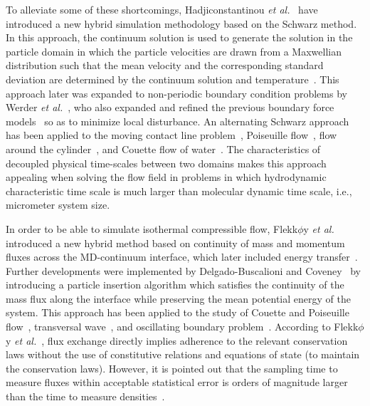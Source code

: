 \documentclass[preprint,12pt]{elsarticle}
\begin{document}
To alleviate some of these shortcomings, Hadjiconstantinou {\it{et al.}}~\cite{Hadjicon1,Hadjicon2,Hadjicon3} 
have introduced a new hybrid simulation methodology based on the Schwarz method. In this approach, the continuum solution is used to generate the solution in the particle domain in which the particle velocities are drawn from a Maxwellian distribution such that the mean velocity and the corresponding standard deviation are determined by the continuum solution and temperature~\cite{Hadjicon2}. This approach later was expanded to non-periodic boundary condition problems by Werder {\it{et al.}}~\cite{Werder}, who also expanded and refined the previous boundary force models~\cite{Thompson,Flekkoy,Delgado1,Nie} so as to minimize local disturbance. 
An alternating Schwarz approach has been applied to the moving contact line problem~\cite{Hadjicon2}, Poiseuille flow~\cite{Hadjicon3}, flow around the cylinder~\cite{Werder}, and Couette flow of water~\cite{Kotsalis}. The characteristics of decoupled physical time-scales between two domains makes this approach appealing when solving the flow field in problems in which hydrodynamic characteristic time scale is much larger than molecular dynamic time scale, i.e., micrometer system size.~\cite{Hadjicon2} 


In order to be able to simulate isothermal compressible flow, Flekk$\phi$y {\it{et al.}}~\cite{Flekkoy} introduced a new hybrid method based on continuity of mass and momentum fluxes across the MD-continuum interface, which later included energy transfer~\cite{Wagner,Delgado1}. Further developments were implemented by Delgado-Buscalioni and Coveney~\cite{USHER} by introducing a particle insertion algorithm which satisfies the continuity of the mass flux along the interface while preserving the mean potential energy of the system. This approach has been applied to the study of Couette and Poiseuille flow~\cite{Flekkoy}, transversal wave~\cite{Delgado1}, and oscillating boundary problem~\cite{Time_Mechanism}. According to Flekk$\phi$y {\it{et al.}}~\cite{Flekkoy}, flux exchange directly implies adherence to the relevant conservation laws without the use of constitutive relations and equations of state (to maintain the conservation laws). However, it is pointed out that the sampling time to measure fluxes within acceptable statistical error is orders of magnitude larger than the time to measure densities~\cite{Hadjicon3}.
\end{document}
